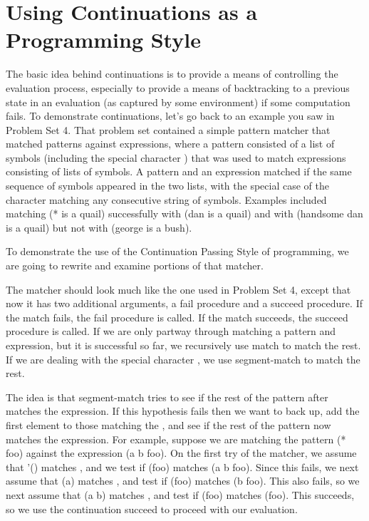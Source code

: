 \section{Using Continuations as a Programming Style}

The basic idea behind continuations is to provide a means of
controlling the evaluation process, especially to provide a means of
backtracking to a previous state in an evaluation (as captured by some
environment) if some computation fails.  To demonstrate continuations,
let's go back to an example you saw in Problem Set 4.   That
problem set contained a simple pattern matcher that
matched patterns against expressions, where a pattern consisted of a
list of symbols (including the special character {\cf *}) that was used to match
expressions consisting of lists of symbols.  A pattern and an
expression matched if the same sequence of symbols appeared in the two
lists, with the special case of the character {\cf *} matching any consecutive
string of symbols.  Examples included matching {\cf (* is a quail)}
successfully with {\cf (dan is a quail)} and with {\cf (handsome dan is
a quail)} but not with {\cf (george is a bush)}.

To demonstrate the use of the Continuation Passing Style of programming,
we are going to rewrite and examine portions of that matcher.

The matcher should look much like the one used in Problem Set 4, except that
now it has two additional arguments, a {\cf fail} procedure and a
{\cf succeed} procedure.  If the match fails, the {\cf fail}
procedure is called.  If the match succeeds, the {\cf succeed}
procedure is called.  If we are only partway through
matching a pattern and expression, but it is successful so far, we
recursively use {\cf match} to match the rest.  If we are dealing
with the special character {\cf *}, we use {\cf segment-match} to match the
rest.

The idea is that {\cf segment-match} tries to see if the rest of the
pattern after {\cf *} matches the expression.  If this hypothesis fails
then we want to back up, add the first element to those matching the
{\cf *},  and see if the rest of the pattern now matches the expression.
For example, suppose we are matching the pattern {\cf (* foo)} against the expression
{\cf (a b foo)}.  On the first try of the matcher, we assume that {\cf
'()} matches {\cf *}, and we test if {\cf (foo)} matches {\cf (a b
foo)}.  Since this fails, we next assume that {\cf (a)} matches {\cf *},
and test if {\cf (foo)} matches {\cf (b foo)}.  This also fails, so we
next assume that {\cf (a b)} matches {\cf *}, and test if {\cf (foo)}
matches {\cf (foo)}.  This succeeds, so we use the continuation {\cf
succeed} to proceed with our evaluation.

